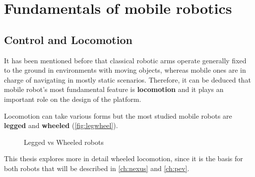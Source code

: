 \section{Fundamentals of mobile robotics}

\subsection{Control and Locomotion}

It has been mentioned before that classical robotic arms operate generally fixed to the ground in environments with moving objects, whereas mobile ones are in charge of navigating in mostly static scenarios. Therefore, it can be deduced that mobile robot's most fundamental feature is \textbf{locomotion}  and it plays an important role on the design of the platform. 

Locomotion can take various forms but the most studied mobile robots are \textbf{legged} and \textbf{wheeled} (\autoref{fig:legwheel}). 

\begin{figure}[htb]
  \centering
   \quad
  \caption{Legged vs Wheeled robots}
  \label{fig:legwheel}
\end{figure}  

This thesis explores more in detail wheeled locomotion, since it is the basis for both robots that will be described in \autoref{ch:nexus} and \autoref{ch:pev}.

